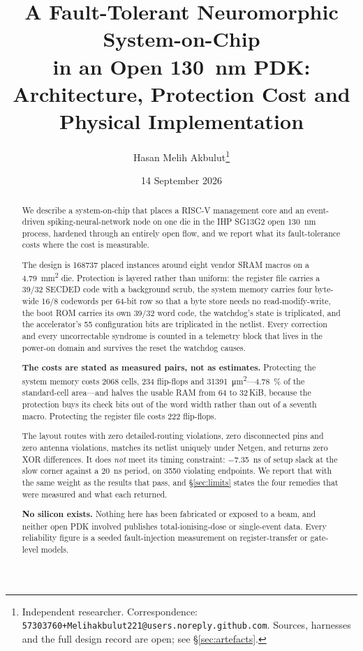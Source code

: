 \documentclass[11pt,a4paper]{article}
\title{A Fault-Tolerant Neuromorphic System-on-Chip\\
in an Open \SI{130}{\nano\meter} PDK:\\
\large Architecture, Protection Cost and Physical Implementation}
\author{Hasan Melih Akbulut\thanks{Independent researcher.
Correspondence: \texttt{57303760+Melihakbulut221@users.noreply.github.com}.
Sources, harnesses and the full design record are open; see
\S\ref{sec:artefacts}.}}
\date{14 September 2026}
\begin{document}
\maketitle

\begin{abstract}
We describe a system-on-chip that places a RISC-V management core and an
event-driven spiking-neural-network node on one die in the IHP SG13G2
open \SI{130}{\nano\meter} process, hardened through an entirely open
flow, and we report what its fault-tolerance costs where the cost is
measurable.

The design is \num{168737} placed instances around eight vendor SRAM
macros on a \SI{4.79}{\milli\meter\squared} die. Protection is layered
rather than uniform: the register file carries a \num{39}/\num{32}
SECDED code with a background scrub, the system memory carries four
byte-wide \num{16}/\num{8} codewords per \num{64}-bit row so that a byte
store needs no read-modify-write, the boot ROM carries its own
\num{39}/\num{32} word code, the watchdog's state is triplicated, and the
accelerator's \num{55} configuration bits are triplicated in the netlist.
Every correction and every uncorrectable syndrome is counted in a
telemetry block that lives in the power-on domain and survives the reset
the watchdog causes.

\textbf{The costs are stated as measured pairs, not as estimates.}
Protecting the system memory costs \num{2068} cells, \num{234}
flip-flops and \SI{31391}{\micro\meter\squared}---\SI{4.78}{\percent} of
the standard-cell area---and halves the usable RAM from \num{64} to
\num{32}\,KiB, because the protection buys its check bits out of the
word width rather than out of a seventh macro. Protecting the register
file costs \num{222} flip-flops.

The layout routes with zero detailed-routing violations, zero
disconnected pins and zero antenna violations, matches its netlist
uniquely under Netgen, and returns zero XOR differences. It does
\emph{not} meet its timing constraint: \SI{-7.35}{\nano\second} of setup
slack at the slow corner against a \SI{20}{\nano\second} period, on
\num{3550} violating endpoints. We report that with the same weight as
the results that pass, and \S\ref{sec:limits} states the four remedies
that were measured and what each returned.

\textbf{No silicon exists.} Nothing here has been fabricated or exposed
to a beam, and neither open PDK involved publishes total-ionising-dose or
single-event data. Every reliability figure is a seeded fault-injection
measurement on register-transfer or gate-level models.
\end{abstract}
\end{document}
